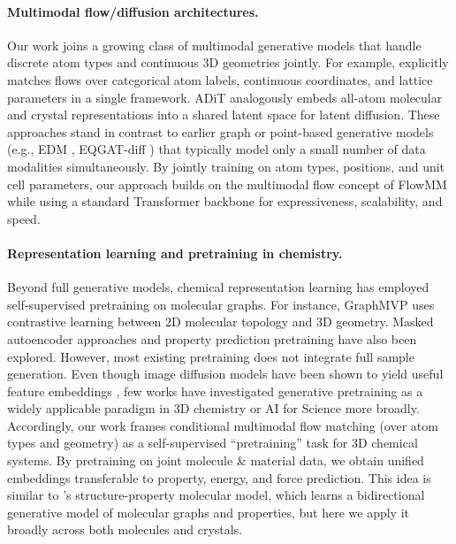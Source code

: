 \documentclass{article}
\theoremstyle{plain}
\theoremstyle{definition}
\theoremstyle{remark}
\begin{document}
\paragraph{Multimodal flow/diffusion architectures.} Our work joins a growing class of multimodal generative models that handle discrete atom types and continuous 3D geometries jointly. For example, \citet{miller2024flowmm} explicitly matches flows over categorical atom labels, continuous coordinates, and lattice parameters in a single framework. ADiT \citep{joshi2025allatom} analogously embeds all-atom molecular and crystal representations into a shared latent space for latent diffusion. These approaches stand in contrast to earlier graph or point-based generative models (e.g., EDM \citep{hoogeboom2022equivariant}, EQGAT-diff \citep{le2024navigating}) that typically model only a small number of data modalities simultaneously. By jointly training on atom types, positions, and unit cell parameters, our approach builds on the multimodal flow concept of FlowMM while using a standard Transformer backbone for expressiveness, scalability, and speed.

\paragraph{Representation learning and pretraining in chemistry.} Beyond full generative models, chemical representation learning has employed self-supervised pretraining on molecular graphs. For instance, GraphMVP \citep{liu2022graphmvp} uses contrastive learning between 2D molecular topology and 3D geometry. Masked autoencoder approaches and property prediction pretraining have also been explored. However, most existing pretraining does not integrate full sample generation. Even though image diffusion models have been shown to yield useful feature embeddings \citep{li2023image, velez2025video}, few works have investigated generative pretraining as a widely applicable paradigm in 3D chemistry or AI for Science more broadly. Accordingly, our work frames conditional multimodal flow matching (over atom types and geometry) as a self-supervised “pretraining” task for 3D chemical systems. By pretraining on joint molecule \& material data, we obtain unified embeddings transferable to property, energy, and force prediction. This idea is similar to \citet{Chang2024SPMM}'s structure-property molecular model, which learns a bidirectional generative model of molecular graphs and properties, but here we apply it broadly across both molecules and crystals.
\end{document}
